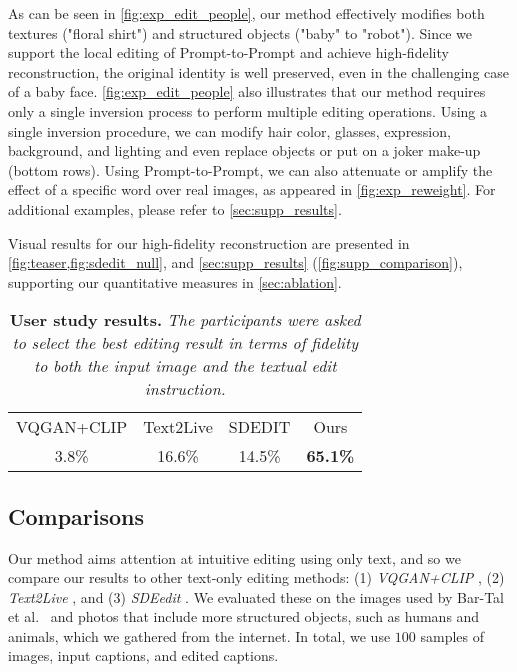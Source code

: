 As can be seen in \cref{fig:exp_edit_people}, our method effectively modifies both textures ("floral shirt") and structured objects ("baby" to "robot"). Since we support the local editing of Prompt-to-Prompt and achieve high-fidelity reconstruction, the original identity is well preserved, even in the challenging case of a baby face.
\cref{fig:exp_edit_people} also illustrates that our method requires only a single inversion process to perform multiple editing operations. Using a single inversion procedure, we can modify hair color, glasses, expression, background, and lighting and even replace objects or put on a joker make-up (bottom rows). Using Prompt-to-Prompt, we can also attenuate or amplify the effect of a specific word over real images, as appeared in \cref{fig:exp_reweight}.
For additional examples, please refer to \cref{sec:supp_results}.


Visual results for our high-fidelity reconstruction are presented in \cref{fig:teaser,fig:sdedit_null}, and \cref{sec:supp_results} (\cref{fig:supp_comparison}), supporting our quantitative measures in \cref{sec:ablation}.






 \begin{table}
\caption{{\bf User study results.} {\it The participants were asked to select the best editing result in terms of fidelity to both the input image and the textual edit instruction.}}
 \footnotesize
 \centering
\vspace{-0.25cm}
\begin{tabular}{cccc}

\toprule

VQGAN+CLIP & Text2Live & SDEDIT & Ours \\
3.8\% & 16.6\% & 14.5\%  & {\bf 65.1\%} \\


\bottomrule
\end{tabular}
\vspace{-0.2cm}
\label{tab:user-study}
 \end{table}
 
  
\subsection{Comparisons}
\label{sec:comparisons}




Our method aims attention at intuitive editing using only text, and so we compare our results to other text-only editing methods: (1) \textit{VQGAN+CLIP} \cite{katherine2021vqganclip}, (2) \textit{Text2Live} \cite{bar2022text2live}, and (3) \textit{SDEedit} \cite{meng2021sdedit}. We evaluated these on the images used by Bar-Tal et al.~\cite{bar2022text2live} and photos that include more structured objects, such as humans and animals, which we gathered from the internet. In total, we use $100$ samples of images, input captions, and edited captions. 


